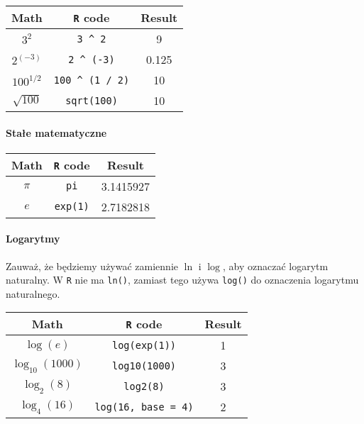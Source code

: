 \documentclass[
]{article}
\begin{document}
\begin{longtable}[]{@{}ccc@{}}
\toprule
Math & \texttt{R} code & Result \\
\midrule
\endhead
\(3^2\) & \texttt{3\ \^{}\ 2} & 9 \\
\(2^{(-3)}\) & \texttt{2\ \^{}\ (-3)} & 0.125 \\
\(100^{1/2}\) & \texttt{100\ \^{}\ (1\ /\ 2)} & 10 \\
\(\sqrt{100}\) & \texttt{sqrt(100)} & 10 \\
\bottomrule
\end{longtable}

\hypertarget{staux142e-matematyczne}{%
\paragraph*{Stałe matematyczne}\label{staux142e-matematyczne}}

\begin{longtable}[]{@{}ccc@{}}
\toprule
Math & \texttt{R} code & Result \\
\midrule
\endhead
\(\pi\) & \texttt{pi} & 3.1415927 \\
\(e\) & \texttt{exp(1)} & 2.7182818 \\
\bottomrule
\end{longtable}

\hypertarget{logarytmy}{%
\paragraph*{Logarytmy}\label{logarytmy}}

Zauważ, że będziemy używać zamiennie \(\ln\) i \(\log\), aby oznaczać
logarytm naturalny. W \texttt{R} nie ma \texttt{ln()}, zamiast tego
używa \texttt{log()} do oznaczenia logarytmu naturalnego.

\begin{longtable}[]{@{}ccc@{}}
\toprule
Math & \texttt{R} code & Result \\
\midrule
\endhead
\(\log(e)\) & \texttt{log(exp(1))} & 1 \\
\(\log_{10}(1000)\) & \texttt{log10(1000)} & 3 \\
\(\log_{2}(8)\) & \texttt{log2(8)} & 3 \\
\(\log_{4}(16)\) & \texttt{log(16,\ base\ =\ 4)} & 2 \\
\bottomrule
\end{longtable}
\end{document}
